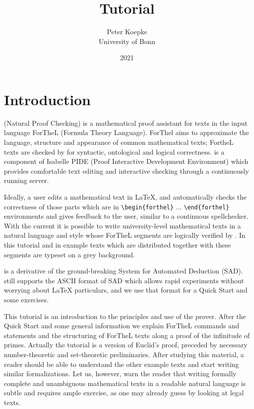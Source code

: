 \documentclass[11pt]{article}
\author{Peter Koepke\\University of Bonn}
\title{\textbf{\Naproche{} Tutorial}}
\date{2021}
\begin{document}
\newcommand{\Prod}[3]{#1_{#2} \cdots #1_{#3}}
\newcommand{\Seq}[2]{\{#1,\dots,#2\}}
\newcommand{\Finset}[3]{\{#1_{#2},\dots,#1_{#3}\}}
\newcommand{\Primes}{\mathbb{P}}

\maketitle

\section{Introduction}
\Naproche{} (Natural Proof Checking) is a mathematical proof assistant
for texts in the input language ForTheL (Formula Theory Language).
ForThel aims to approximate the
language, structure and appearance of common mathematical texts;
FortheL texts are checked by \Naproche{} for syntactic, ontological
and logical correctness. \Naproche{} is a component of
Isabelle PIDE (Proof Interactive Development Environment) which provides
comfortable text editing and interactive checking through a continuously
running \Naproche{} server.

Ideally, a user edits a mathematical text in \LaTeX{}, and
\Naproche{} automatically checks the correctness of those parts which are
in \verb+\begin+\verb+{forthel}+ ... \verb+\end{forthel}+ 
environments and gives
feedback to the user, similar to a continuous spellchecker. With
the current \Naproche{} it is possible to write university-level mathematical texts 
in a natural language and style whose ForTheL segments are logically
verified by \Naproche{}. In this tutorial and in example texts
which are distributed together with \Naproche{} these segments
are typeset on a grey background.

\Naproche{} is a derivative of the ground-breaking System 
for Automated Deduction (SAD). \Naproche{} still supports the 
ASCII format  of SAD which allows rapid 
experiments without worrying about LaTeX particulars, and we
use that format for a Quick Start and some exercises. 

This tutorial is an introduction to the principles and
use of the \Naproche{} prover. After the Quick Start and 
some general information we explain 
ForTheL commands and statements and the structuring of ForTheL texts
along a proof of the infinitude of primes. Actually the tutorial is 
a version of Euclid's proof, preceded by 
necessary number-theoretic and set-theoretic preliminaries.
After studying this material, a reader should be able to understand the
other example texts and start writing similar formalizations.
Let us, however, warn the reader that writing formally complete
and unambiguous mathematical texts in a readable natural language 
is subtle and requires ample exercise, as one may already guess by
looking at legal texts.
\end{document}
